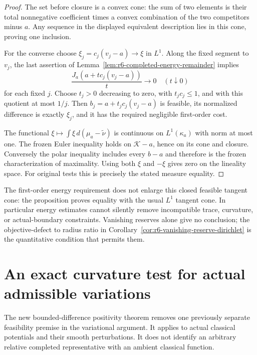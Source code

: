 \documentclass[11pt,a4paper]{article}
\numberwithin{equation}{section}
\theoremstyle{definition}
\theoremstyle{remark}
\begin{document}
\begin{proof}
The set before closure is a convex cone: the sum of two elements is
their total nonnegative coefficient times a convex combination of the
two competitors minus $a$. Any sequence in the displayed equivalent
description lies in this cone, proving one inclusion.

For the converse choose $\xi_j=c_j(v_j-a)\to\xi$ in $L^1$.
Along the fixed segment to $v_j$, the last assertion of
Lemma~\ref{lem:r6-completed-energy-remainder} implies
\[
 \frac{J_a(a+t c_j(v_j-a))}{t}\longrightarrow0
                       \quad(t\downarrow0)
\]
for each fixed $j$. Choose $t_j>0$ decreasing to zero, with
$t_jc_j\le1$, and with this quotient at most $1/j$.
Then $b_j=a+t_jc_j(v_j-a)$ is feasible, its normalized difference is
exactly $\xi_j$, and it has the required negligible first-order cost.

The functional $\xi\mapsto\int\xi\,d(\mu_a-\widetilde\nu)$ is
continuous on $L^1(\kappa_a)$ with norm at most one. The frozen Euler
inequality holds on $\mathscr K-a$, hence on its cone and closure.
Conversely the polar inequality includes every $b-a$ and therefore is
the frozen characterization of maximality. Using both $\xi$ and
$-\xi$ gives zero on the lineality space. For original tests this is
precisely the stated measure equality.
\end{proof}

The first-order energy requirement does not enlarge this closed
feasible tangent cone: the proposition proves equality with the usual
$L^1$ tangent cone. In particular energy estimates cannot silently
remove incompatible trace, curvature, or actual-boundary constraints.
Vanishing reserves alone give no conclusion; the objective-defect to
radius ratio in Corollary~\ref{cor:r6-vanishing-reserve-dirichlet} is the
quantitative condition that permits them.



\section{An exact curvature test for actual admissible variations}
\label{sec:r6-actual-variation-radius}

The new bounded-difference positivity theorem removes one previously
separate feasibility premise in the variational argument. It applies
to actual classical potentials and their smooth perturbations. It
does not identify an arbitrary relative completed representative with
an ambient classical function.
\end{document}
